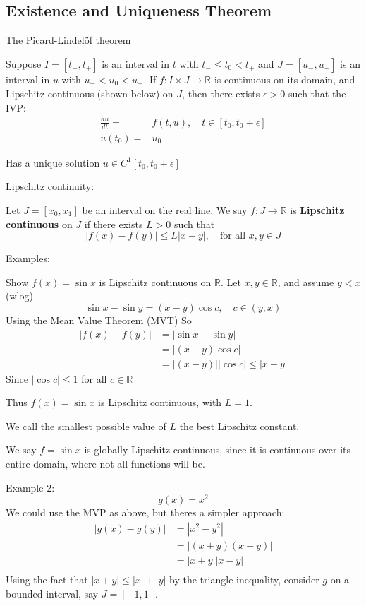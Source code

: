 \documentclass{/home/janmebows/Documents/LatexTemplates/myassignment}
\begin{document}
\subsection{Existence and Uniqueness Theorem}
The Picard-Lindel\"of theorem 

Suppose $I = [t_-,t_+]$ is an interval in $t$ with $t_- \leq t_0 < t_+$ and $J=[u_-,u_+]$ is an interval in $u$ with $u_-<u_0<u_+$. If $f : I\times J \to \mathbb{R}$ is continuous on its domain, and Lipschitz continuous (shown below) on $J$, then there exists $\epsilon >0$ such that the IVP:
\begin{align*}
    \frac{du}{dt} =& f(t,u),\quad t\in [t_0,t_0+\epsilon]\\
    u(t_0) =& u_0
\end{align*}

Has a unique solution $u \in C^1 [t_0,t_0+\epsilon]$

Lipschitz continuity:

Let $J=[x_0,x_1]$ be an interval on the real line. We say $f: J\to \mathbb{R}$ is  \textbf{Lipschitz continuous} on $J$ if there exists $L>0$ such that
\[|f(x) - f(y)| \leq L|x-y|,\quad \text{for all } x,y\in J\]

Examples:

Show $f(x) = \sin x$ is Lipschitz continuous on $\mathbb{R}$. Let $x,y \in \mathbb{R}$, and assume $y < x$ (wlog)
\[\sin x - \sin y = (x - y)\cos c,\quad c \in (y,x)\]
Using the Mean Value Theorem (MVT)
So
\begin{align*}
    |f(x) - f(y)| &= |\sin x - \sin y|\\
    &=|(x - y)\cos c|\\
    &=|(x-y)||\cos c| \leq |x-y|
\end{align*}
Since $|\cos c| \leq 1 $ for all $c \in \mathbb{R}$

Thus $f(x) = \sin x$ is Lipschitz continuous, with $L=1$. 

We call the smallest possible value of $L$ the best Lipschitz constant.

We say $f=\sin x$ is globally Lipschitz continuous, since it is continuous over its entire domain, where not all functions will be.


Example 2:
\[g(x) = x^2\]
We could use the MVP as above, but theres a simpler approach:
\begin{align*}
    |g(x) - g(y)| &= |x^2 - y^2|\\
    &= |(x+y)(x-y)|\\
    &= |x+y||x-y|\\
\end{align*}
Using the fact that $|x+y| \leq |x|+|y|$ by the triangle inequality, consider $g$ on a bounded interval, say $J = [-1,1]$.
\end{document}
